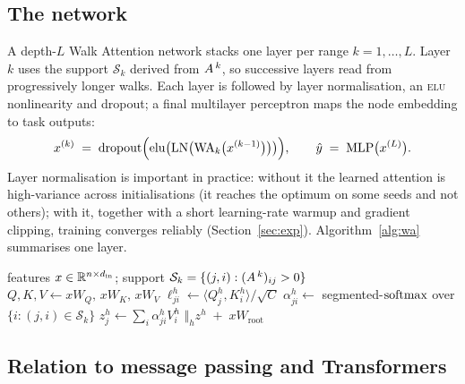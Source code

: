 \subsection{The network}

A depth-$L$ Walk Attention network stacks one layer per range
$k=1,\dots,L$. Layer $k$ uses the support $\mathcal{S}_k$ derived from
$A^{\,k}$, so successive layers read from progressively longer walks. Each
layer is followed by layer normalisation, an \textsc{elu} nonlinearity and
dropout; a final multilayer perceptron maps the node embedding to task outputs:
\[
  x^{(k)} \;=\; \mathrm{dropout}\Bigl(\mathrm{elu}\bigl(\mathrm{LN}\bigl(
  \mathrm{WA}_k\bigl(x^{(k-1)}\bigr)\bigr)\bigr)\Bigr),\qquad
  \hat y \;=\; \mathrm{MLP}\bigl(x^{(L)}\bigr).
\]
Layer normalisation is important in practice: without it the learned attention is
high-variance across initialisations (it reaches the optimum on some seeds and
not others); with it, together with a short learning-rate warmup and gradient
clipping, training converges reliably (Section~\ref{sec:exp}).
Algorithm~\ref{alg:wa} summarises one layer.

\begin{algorithm}[t]
\caption{Walk Attention layer at range $k$ (sparse).}\label{alg:wa}
\begin{algorithmic}[1]
\Require features $x\in\mathbb{R}^{n\times d_{\text{in}}}$; support
  $\mathcal{S}_k=\{(j,i):(A^{\,k})_{ij}>0\}$
\State $Q,K,V \gets xW_Q,\,xW_K,\,xW_V$ 
  \State $\ell^h_{ji}\gets \langle Q^h_j,K^h_i\rangle/\sqrt{C}$
\EndFor
\State $\alpha^h_{ji}\gets$ segmented-$\operatorname{softmax}$ over $\{i:(j,i)\in\mathcal{S}_k\}$
\State $z^h_j\gets \sum_i \alpha^h_{ji}V^h_i$
\State \Return $\bigl\Vert_h z^h \;+\; xW_{\!\text{root}}$
\end{algorithmic}
\end{algorithm}

\subsection{Relation to message passing and Transformers}

